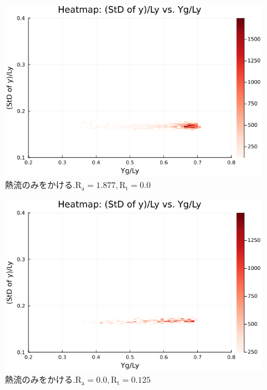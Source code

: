 \begin{figure}[H]
  \centering
  \includegraphics[scale=0.6]{image/g0_heat/2024-01-15T14:07:34.770_mapg0_chiinf_Ay50_rho0.4_T0.43_dT0.04_Rd0.0_Rt0.0_Ra1.877538_g0_run4.0e7.png}
  \caption{$熱流のみをかける. \text{R}_\text{a}=1.877,\text{R}_\text{t}=0.0$}
  \label{}
\end{figure}

\begin{figure}[H]
  \centering
  \includegraphics[scale=0.6]{image/g0_heat/2024-01-15T14:07:34.852_mapg0_chiinf_Ay50_rho0.4_T0.43_dT0.04_Rd0.0_Rt0.125_Ra0.0_g0_run4.0e7.png}
  \caption{$熱流のみをかける. \text{R}_\text{a}=0.0,\text{R}_\text{t}=0.125$}
  \label{}
\end{figure}

